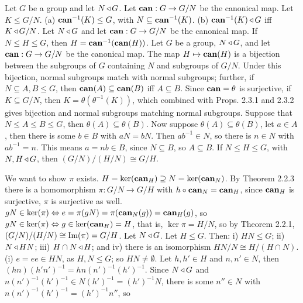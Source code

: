  Let $G$ be a group and let $N \operatorname{\triangleleft} G$. Let $\text{\textbf{can}} : G \to G/N$ be the canonical map. Let $K \le G/N$. (a) $\text{\textbf{can}}^{-1}(K) \le G$, with $N \subseteq \text{\textbf{can}}^{-1}(K)$. (b) $
\text{\textbf{can}}^{-1}(K) \operatorname{\triangleleft} G$ iff $K \operatorname{\triangleleft} G/N$.
  Let $N \operatorname{\triangleleft} G$ and let $\text{\textbf{can}} : G \to G/N$ be the canonical map. If $N \le H \le G$, then $H = \text{\textbf{can}}^{-1}(\text{\textbf{can}}(H))$.
 Let $G$ be a group, $N \operatorname{\triangleleft} G$, and let $\text{\textbf{can}} : G \to G/N$ be the canonical map. The map $H \mapsto \text{\textbf{can}}(H)$ is a bijection between the subgroups of $G$ containing $N$ and subgroups of $G/N$. Under this bijection, normal subgroups match with normal subgroups; further, if $N \subseteq A,B \le G$, then $\text{\textbf{can}}(A) \subseteq \text{\textbf{can}}(B)$ iff $A \subseteq B$.
\wpf{} Since $\text{\textbf{can}} = \theta$ is surjective, if $K \subseteq G/N$, then $K = \theta(\theta^{-1}(K))$, which combined with Props. 2.3.1 and 2.3.2 gives bijection and normal subgroups matching normal subgroups. Suppose that $N \le A \le B \le G$, then $\theta(A) \subseteq \theta(B)$. Now suppose $\theta(A) \subseteq \theta(B)$, let $a \in A$, then there is some $b \in B$ with $aN = bN$. Then $ab^{-1} \in N$, so there is $n \in N$ with $ab^{-1} = n$. This means $a = nb \in B$, since $N \subseteq B$, so $A \subseteq B$.
 If $N \le H \le G$, with $N, H \operatorname{\triangleleft} G$, then $(G/N)/(H/N) \cong G/H$.
\wpf{} %
 We want to show $\pi$ exists. $H = \ker(\text{\textbf{can}}_H) \supseteq N = \ker(\text{\textbf{can}}_N)$. By Theorem 2.2.3 there is a homomorphism $\pi : G/N \to G/H$ with $h \circ \text{\textbf{can}}_N = \text{\textbf{can}}_H$, since $\text{\textbf{can}}_H$ is surjective, $\pi$ is surjective as well. $gN \in \ker(\pi) \Leftrightarrow e = \pi(gN) = \pi(\text{\textbf{can}}_N(g)) = \text{\textbf{can}}_H(g)$, so $gN \in \ker(\pi) \Leftrightarrow g \in \ker(\text{\textbf{can}}_H) = H$, that is, $\ker\pi = H/N$, so by Theorem 2.2.1, $(G/N)/(H/N) \cong \text{Im}(\pi) = G/H$.
%
 Let $N \operatorname{\triangleleft} G$. Let $H \le G$. Then: i) $HN \le G$; ii) $N \operatorname{\triangleleft} HN$; iii) $H \cap N \operatorname{\triangleleft} H$; and iv) there is an isomorphism $HN/N \cong H/(H \cap N)$.
\wpf{} (i) $e = ee \in HN$, as $H, N \le G$; so $HN \ne \emptyset$. Let $h, h' \in H$ and $n, n' \in N$, then $(hn)(h'n')^{-1} = hn(n')^{-1}(h')^{-1}$. Since $N \operatorname{\triangleleft} G$ and $n(n')^{-1}(h')^{-1} \in N(h')^{-1} = (h')^{-1}N$, there is some $n'' \in N$ with $n(n')^{-1}(h')^{-1} = (h')^{-1}n''$, so 
